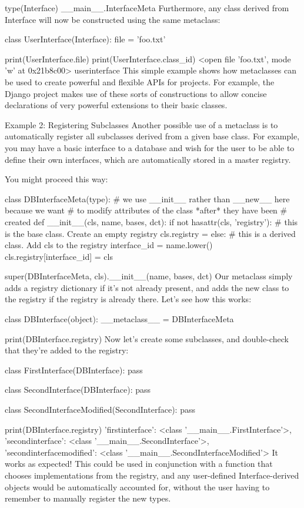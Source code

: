 type(Interface)
__main__.InterfaceMeta
Furthermore, any class derived from Interface will now be constructed using the same metaclass:

class UserInterface(Interface):
    file = 'foo.txt'

print(UserInterface.file)
print(UserInterface.class_id)
<open file 'foo.txt', mode 'w' at 0x21b8c00>
userinterface
This simple example shows how metaclasses can be used to create powerful and flexible APIs for projects. For example, the Django project makes use of these sorts of constructions to allow concise declarations of very powerful extensions to their basic classes.

Example 2: Registering Subclasses
Another possible use of a metaclass is to automatically register all subclasses derived from a given base class. For example, you may have a basic interface to a database and wish for the user to be able to define their own interfaces, which are automatically stored in a master registry.

You might proceed this way:

class DBInterfaceMeta(type):
    # we use __init__ rather than __new__ here because we want
    # to modify attributes of the class *after* they have been
    # created
    def __init__(cls, name, bases, dct):
        if not hasattr(cls, 'registry'):
            # this is the base class.  Create an empty registry
            cls.registry = {}
        else:
            # this is a derived class.  Add cls to the registry
            interface_id = name.lower()
            cls.registry[interface_id] = cls

        super(DBInterfaceMeta, cls).__init__(name, bases, dct)
Our metaclass simply adds a registry dictionary if it's not already present, and adds the new class to the registry if the registry is already there. Let's see how this works:

class DBInterface(object):
    __metaclass__ = DBInterfaceMeta

print(DBInterface.registry)
{}
Now let's create some subclasses, and double-check that they're added to the registry:

class FirstInterface(DBInterface):
    pass

class SecondInterface(DBInterface):
    pass

class SecondInterfaceModified(SecondInterface):
    pass

print(DBInterface.registry)
{'firstinterface': <class '__main__.FirstInterface'>, 'secondinterface': <class '__main__.SecondInterface'>, 'secondinterfacemodified': <class '__main__.SecondInterfaceModified'>}
It works as expected! This could be used in conjunction with a function that chooses implementations from the registry, and any user-defined Interface-derived objects would be automatically accounted for, without the user having to remember to manually register the new types.

